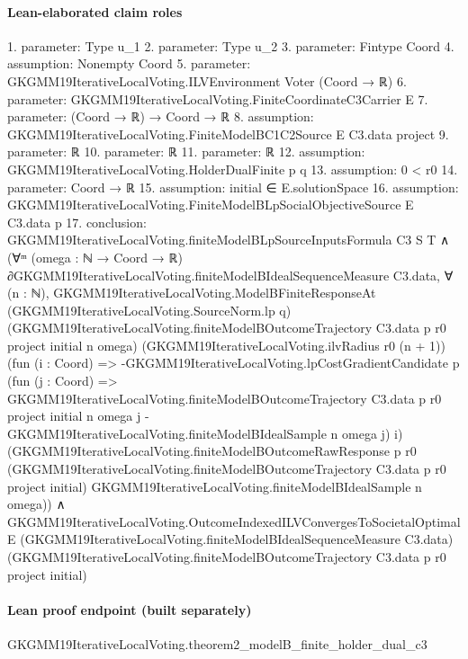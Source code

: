 \documentclass[10pt]{article}
\begin{document}
\paragraph{Lean-elaborated claim roles}\begin{ReviewVerbatim}
1. parameter: Type u_1
2. parameter: Type u_2
3. parameter: Fintype Coord
4. assumption: Nonempty Coord
5. parameter: GKGMM19IterativeLocalVoting.ILVEnvironment Voter (Coord → ℝ)
6. parameter: GKGMM19IterativeLocalVoting.FiniteCoordinateC3Carrier E
7. parameter: (Coord → ℝ) → Coord → ℝ
8. assumption: GKGMM19IterativeLocalVoting.FiniteModelBC1C2Source E C3.data project
9. parameter: ℝ
10. parameter: ℝ
11. parameter: ℝ
12. assumption: GKGMM19IterativeLocalVoting.HolderDualFinite p q
13. assumption: 0 < r0
14. parameter: Coord → ℝ
15. assumption: initial ∈ E.solutionSpace
16. assumption: GKGMM19IterativeLocalVoting.FiniteModelBLpSocialObjectiveSource E C3.data p
17. conclusion: GKGMM19IterativeLocalVoting.finiteModelBLpSourceInputsFormula C3 S T ∧
  (∀ᵐ (omega : ℕ → Coord → ℝ) ∂GKGMM19IterativeLocalVoting.finiteModelBIdealSequenceMeasure C3.data,
      ∀ (n : ℕ),
        GKGMM19IterativeLocalVoting.ModelBFiniteResponseAt (GKGMM19IterativeLocalVoting.SourceNorm.lp q)
          (GKGMM19IterativeLocalVoting.finiteModelBOutcomeTrajectory C3.data p r0 project initial n omega)
          (GKGMM19IterativeLocalVoting.ilvRadius r0 (n + 1))
          (fun (i : Coord) =>
            -GKGMM19IterativeLocalVoting.lpCostGradientCandidate p
                (fun (j : Coord) =>
                  GKGMM19IterativeLocalVoting.finiteModelBOutcomeTrajectory C3.data p r0 project initial n omega j -
                    GKGMM19IterativeLocalVoting.finiteModelBIdealSample n omega j)
                i)
          (GKGMM19IterativeLocalVoting.finiteModelBOutcomeRawResponse p r0
            (GKGMM19IterativeLocalVoting.finiteModelBOutcomeTrajectory C3.data p r0 project initial)
            GKGMM19IterativeLocalVoting.finiteModelBIdealSample n omega)) ∧
    GKGMM19IterativeLocalVoting.OutcomeIndexedILVConvergesToSocietalOptimal E
      (GKGMM19IterativeLocalVoting.finiteModelBIdealSequenceMeasure C3.data)
      (GKGMM19IterativeLocalVoting.finiteModelBOutcomeTrajectory C3.data p r0 project initial)
\end{ReviewVerbatim}

\paragraph{Lean proof endpoint (built separately)}\begin{ReviewVerbatim}
GKGMM19IterativeLocalVoting.theorem2_modelB_finite_holder_dual_c3
\end{ReviewVerbatim}
\end{document}
